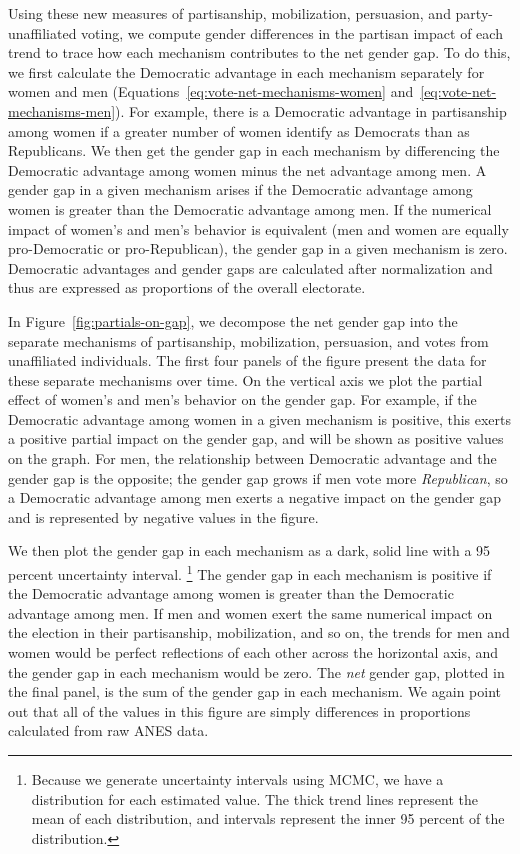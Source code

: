 \documentclass[12pt
               ,final
               ]{article}
\begin{document}
Using these new measures of partisanship, mobilization, persuasion, and party-unaffiliated voting, we compute gender differences in the partisan impact of each trend to trace how each mechanism contributes to the net gender gap. To do this, we first calculate the Democratic advantage in each mechanism separately for women and men (Equations~\ref{eq:vote-net-mechanisms-women} and~\ref{eq:vote-net-mechanisms-men}). For example, there is a Democratic advantage in partisanship among women if a greater number of women identify as Democrats than as Republicans. We then get the gender gap in each mechanism by differencing the Democratic advantage among women minus the net advantage among men. A gender gap in a given mechanism arises if the Democratic advantage among women is greater than the Democratic advantage among men. If the numerical impact of women's and men's behavior is equivalent (men and women are equally pro-Democratic or pro-Republican), the gender gap in a given mechanism is zero. Democratic advantages and gender gaps are calculated after normalization and thus are expressed as proportions of the overall electorate. 

In Figure~\ref{fig:partials-on-gap}, we decompose the net gender gap into the separate mechanisms of partisanship, mobilization, persuasion, and votes from unaffiliated individuals. The first four panels of the figure present the data for these separate mechanisms over time. On the vertical axis we plot the partial effect of women's and men's behavior on the gender gap. For example, if the Democratic advantage among women in a given mechanism is positive, this exerts a positive partial impact on the gender gap, and will be shown as positive values on the graph. For men, the relationship between Democratic advantage and the gender gap is the opposite; the gender gap grows if men vote more \emph{Republican}, so a Democratic advantage among men exerts a negative impact on the gender gap and is represented by negative values in the figure. 

We then plot the gender gap in each mechanism as a dark, solid line with a 95 percent uncertainty interval.%
  \footnote{Because we generate uncertainty intervals using MCMC, we have a distribution for each estimated value. The thick trend lines represent the mean of each distribution, and intervals represent the inner 95 percent of the distribution.} 
The gender gap in each mechanism is positive if the Democratic advantage among women is greater than the Democratic advantage among men. If men and women exert the same numerical impact on the election in their partisanship, mobilization, and so on, the trends for men and women would be perfect reflections of each other across the horizontal axis, and the gender gap in each mechanism would be zero. The \emph{net} gender gap, plotted in the final panel, is the sum of the gender gap in each mechanism. We again point out that all of the values in this figure are simply differences in proportions calculated from raw ANES data.
\end{document}
